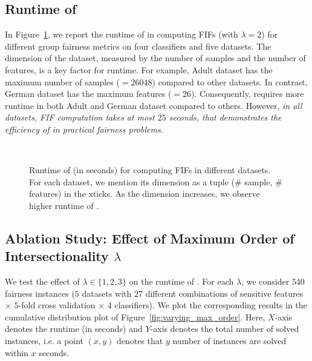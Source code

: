\subsection{Runtime of {\framework}} 
In Figure~\ref{fig:runtime}, we report the runtime of {\framework} in computing FIFs (with $ \lambda = 2 $) for different group fairness metrics on four classifiers and five datasets. The dimension of the dataset, measured by the number of samples and the number of features, is a key factor for runtime. For example, Adult dataset has the maximum number of samples ($ = 26048 $) compared to other datasets. In contrast, German dataset has the maximum features ($ = 26 $). Consequently, {\framework} requires more runtime in both Adult and German dataset compared to others. However, \emph{in all datasets, FIF computation takes at most $ 25 $ seconds, that demonstrates the efficiency of {\framework} in practical fairness problems.}

\begin{figure}[h!]
	\centering
	\\
	\caption{Runtime of {\framework} (in seconds) for computing FIFs in different datasets. For each dataset, we mention its dimension as a tuple (\# sample, \# features) in the xticks. As the dimension increases, we observe higher runtime of {\framework}.}\label{fig:runtime}\vspace*{-1em}
\end{figure}

\subsection{Ablation Study: Effect of Maximum Order of Intersectionality $ \lambda $}\label{sec:ablation} 
We test the effect of $ \lambda \in \{1, 2, 3\} $ on the runtime of {\framework}. For each $ \lambda $, we consider $ 540 $ fairness instances ($ 5 $ datasets with $ 27 $ different combinations of sensitive features $ \times $ $ 5 $-fold cross validation $ \times $ $ 4 $ classifiers). We plot the corresponding results in the cumulative distribution plot of  Figure~\ref{fig:varying_max_order}. Here, $ X $-axis denotes the runtime (in seconds) and $ Y $-axis denotes the total number of solved instances, i.e. a point $ (x,y) $ denotes that $ y $ number of instances are solved within $ x $ seconds. 

